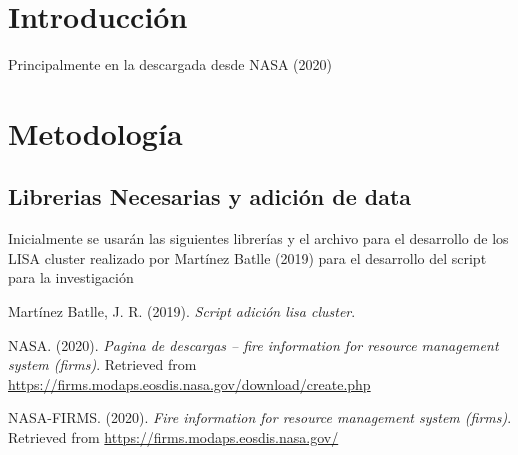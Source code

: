 \documentclass[11pt,]{article}
\begin{document}
\vskip 6.5pt


\noindent  \section{Introducción}\label{introducciuxf3n}

Principalmente en la descargada desde NASA (2020)

\section{Metodología}\label{metodologuxeda}

\subsection{Librerias Necesarias y adición de
data}\label{librerias-necesarias-y-adiciuxf3n-de-data}

Inicialmente se usarán las siguientes librerías y el archivo para el
desarrollo de los LISA cluster realizado por Martínez Batlle (2019) para
el desarrollo del script para la investigación

\hypertarget{refs}{}
\hypertarget{ref-profesorLisa}{}
Martínez Batlle, J. R. (2019). \emph{Script adición lisa cluster}.

\hypertarget{ref-firmsdw}{}
NASA. (2020). \emph{Pagina de descargas -- fire information for resource
management system (firms)}. Retrieved from
\url{https://firms.modaps.eosdis.nasa.gov/download/create.php}

\hypertarget{ref-firmsweb}{}
NASA-FIRMS. (2020). \emph{Fire information for resource management
system (firms)}. Retrieved from
\url{https://firms.modaps.eosdis.nasa.gov/}




\newpage
\singlespacing 
\end{document}
